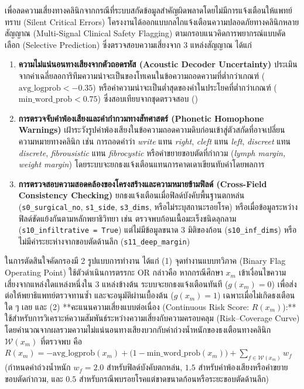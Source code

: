 เพื่อลดความเสี่ยงทางคลินิกจากกรณีที่ระบบสกัดข้อมูลสำคัญผิดพลาดโดยไม่มีการแจ้งเตือนให้แพทย์ทราบ (Silent Critical Errors) โครงงานได้ออกแบบกลไกแจ้งเตือนความปลอดภัยทางคลินิกหลายสัญญาณ (Multi-Signal Clinical Safety Flagging) ตามกรอบแนวคิดการพยากรณ์แบบคัดเลือก (Selective Prediction) \cite{geifman2017selective} ซึ่งตรวจสอบความเสี่ยงจาก 3 แหล่งสัญญาณ ได้แก่
\begin{enumerate}[label=(\arabic*), leftmargin=*, align=left]
    \item \textbf{ความไม่แน่นอนทางเสียงจากตัวถอดรหัส (Acoustic Decoder Uncertainty)} ประเมินจากค่าเฉลี่ยลอการิทึมความน่าจะเป็นของโทเคนในข้อความถอดความที่ต่ำกว่าเกณฑ์ ($\mathrm{avg\_logprob} < -0.35$) หรือค่าความน่าจะเป็นต่ำสุดของคำในประโยคที่ต่ำกว่าเกณฑ์ ($\mathrm{min\_word\_prob} < 0.75$) ซึ่งสอบเทียบจากชุดตรวจสอบ ()
    \item \textbf{การตรวจจับคำพ้องเสียงและคำกำกวมทางสัทศาสตร์ (Phonetic Homophone Warnings)} เฝ้าระวังรูปคำพ้องเสียงในข้อความถอดความดิบก่อนเข้าสู่ตัวสกัดที่อาจเปลี่ยนความหมายทางคลินิก เช่น การถอดคำว่า \textit{write} แทน \textit{right}, \textit{cleft} แทน \textit{left}, \textit{discreet} แทน \textit{discrete}, \textit{fibrousistic} แทน \textit{fibrocystic} หรือคำขยายขอบตัดที่กำกวม (\textit{lymph margin, weight margin}) โดยระบบจะยกธงแจ้งเตือนแทนการคาดเดาเขียนทับค่าโดยพลการ
    \item \textbf{การตรวจสอบความสอดคล้องของโครงสร้างและความหมายข้ามฟิลด์ (Cross-Field Consistency Checking)} ยกธงแจ้งเตือนเมื่อฟิลด์บังคับพื้นฐานตกหล่น (\texttt{s0\_surgical\_no}, \texttt{s1\_side}, \texttt{s3\_dims}, หรือไม่ระบุสถานะรอยโรค) หรือเมื่อข้อมูลระหว่างฟิลด์ขัดแย้งกันตามหลักพยาธิวิทยา เช่น ตรวจพบก้อนเนื้อมะเร็งชนิดลุกลาม (\texttt{s10\_infiltrative = True}) แต่ไม่มีข้อมูลขนาด 3 มิติของก้อน (\texttt{s10\_inf\_dims}) หรือไม่มีค่าระยะห่างจากขอบตัดด้านลึก (\texttt{s11\_deep\_margin})
\end{enumerate}

ในการตัดสินใจคัดกรองมี 2 รูปแบบการทำงาน ได้แก่ (1) จุดทำงานแบบทวิภาค (Binary Flag Operating Point) ใช้ตัวดำเนินการตรรกะ $\mathrm{OR}$ กล่าวคือ หากกรณีศึกษา $x_m$ เข้าเงื่อนไขความเสี่ยงจากแหล่งใดแหล่งหนึ่งใน 3 แหล่งข้างต้น ระบบจะยกธงแจ้งเตือนทันที ($g(x_m) = 0$) เพื่อส่งต่อให้พยาธิแพทย์ตรวจทานซ้ำ และจะอนุมัติผ่านเบื้องต้น ($g(x_m) = 1$) เฉพาะเมื่อไม่เกิดธงเตือนใด ๆ เลย และ (2) **คะแนนความเสี่ยงแบบต่อเนื่อง (Continuous Risk Score: $R(x_m)$):** ใช้สำหรับการวิเคราะห์ความสัมพันธ์ระหว่างความเสี่ยงกับความครอบคลุม (Risk--Coverage Curve) โดยคำนวณจากผลรวมความไม่แน่นอนทางเสียงบวกกับค่าถ่วงน้ำหนักของธงเตือนทางคลินิก $\mathcal{W}(x_m)$ ที่ตรวจพบ คือ $R(x_m) = -\mathrm{avg\_logprob}(x_m) + \bigl(1 - \mathrm{min\_word\_prob}(x_m)\bigr) + \sum_{f \in \mathcal{W}(x_m)} w_f$ (กำหนดค่าถ่วงน้ำหนัก $w_f = 2.0$ สำหรับฟิลด์บังคับตกหล่น, $1.5$ สำหรับคำพ้องเสียงหรือคำขยายขอบตัดกำกวม, และ $0.5$ สำหรับกรณีพบรอยโรคแต่ขาดขนาดก้อนหรือระยะขอบตัดด้านลึก)

